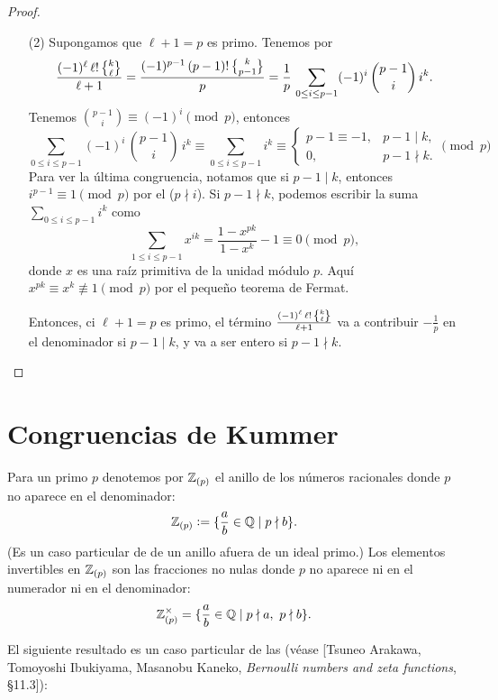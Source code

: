 \documentclass{article}
\begin{document}
\begin{proof}
\begin{itemize}
\item[(2)] Supongamos que $\ell+1 = p$ es primo. Tenemos por 
$$\frac{(-1)^\ell \, \ell! \, \Stirling{k}{\ell}}{\ell+1} = \frac{(-1)^{p-1} \, (p-1)! \, \Stirling{k}{p-1}}{p} = \frac{1}{p}\,\sum_{0 \le i \le p-1} (-1)^i \, {p-1 \choose i} \, i^k.$$
Tenemos ${p - 1 \choose i} \equiv (-1)^i \pmod{p}$, entonces
$$\sum_{0 \le i \le p-1} (-1)^i \, {p-1 \choose i} \, i^k \equiv \sum_{0 \le i \le p-1} i^k \equiv \begin{cases}
p-1 \equiv -1, & p-1 \mid k,\\
0, & p-1 \nmid k.
\end{cases} \pmod{p}$$
Para ver la última congruencia, notamos que si $p-1\mid k$, entonces $i^{p-1} \equiv 1 \pmod{p}$ por el  ($p\nmid i$).  Si $p-1 \nmid k$, podemos escribir la suma $\sum_{0 \le i \le p-1} i^k$ como
$$\sum_{1 \le i \le p-1} x^{ik} = \frac{1-x^{pk}}{1-x^k} - 1 \equiv 0 \pmod{p},$$
donde $x$ es una raíz primitiva de la unidad módulo $p$. Aquí $x^{pk} \equiv x^k \not\equiv 1 \pmod{p}$ por el pequeño teorema de Fermat.

Entonces, ci $\ell+1 = p$ es primo, el término $\frac{(-1)^\ell \, \ell! \, \Stirling{k}{\ell}}{\ell+1}$ va a contribuir $-\frac{1}{p}$ en el denominador si $p-1 \mid k$, y va a ser entero si $p-1 \nmid k$.
\end{itemize}
\end{proof}


\section*{Congruencias de Kummer}

Para un primo $p$ denotemos por $\mathbb{Z}_{(p)}$ el anillo de los números racionales donde $p$ no aparece en el denominador:
$$\mathbb{Z}_{(p)} \mathrel{\mathop:}= \{ \frac{a}{b} \in \mathbb{Q} \mid p\nmid b \}.$$
(Es un caso particular de  de un anillo afuera de un ideal primo.) Los elementos invertibles en $\mathbb{Z}_{(p)}$ son las fracciones no nulas donde $p$ no aparece ni en el numerador ni en el denominador:
$$\mathbb{Z}_{(p)}^\times = \{ \frac{a}{b} \in \mathbb{Q} \mid p\nmid a, ~ p\nmid b \}.$$

El siguiente resultado es un caso particular de las  (véase [Tsuneo Arakawa, Tomoyoshi Ibukiyama, Masanobu Kaneko, \emph{Bernoulli numbers and zeta functions}, \S 11.3]):
\end{document}
